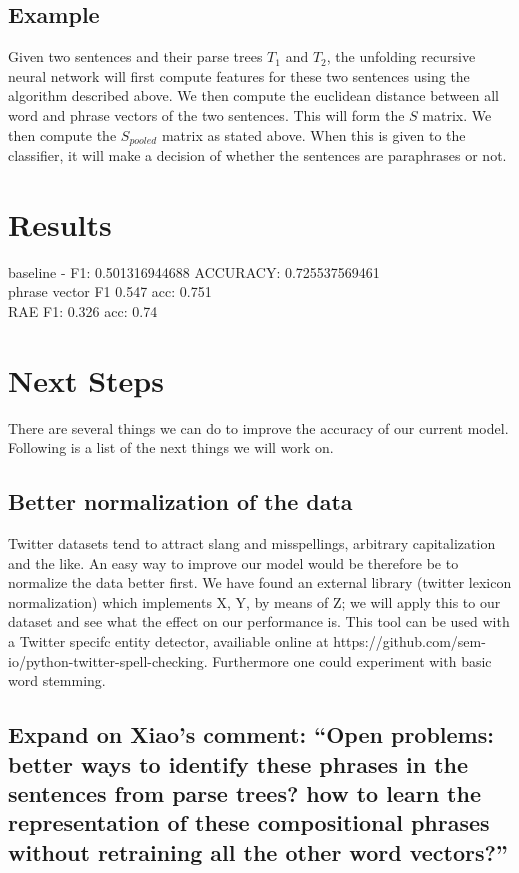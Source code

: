 \documentclass[conference]{IEEEtran}
\begin{document}
\subsection{Example}
Given two sentences and their parse trees $T_1$ and $T_2$, the unfolding recursive neural network will first compute features for these two sentences using the algorithm described above. We then compute the euclidean distance between all word and phrase vectors of the two sentences. This will form the $S$ matrix. We then compute the $S_{pooled}$ matrix as stated above. When this is given to the classifier, it will make a decision of whether the sentences are paraphrases or not.\\

\section{Results}
baseline -  F1:        0.501316944688
    ACCURACY:  0.725537569461\\
phrase vector F1 0.547  acc: 0.751\\
RAE F1: 0.326 acc: 0.74
\section{Next Steps}
There are several things we can do to improve the accuracy of our current model.  Following is a list of the next things we will work on.
\subsection{Better normalization of the data}
Twitter datasets tend to attract slang and misspellings, arbitrary capitalization and the like.  An easy way to improve our model would be therefore be to normalize the data better first.  We have found an external library (twitter lexicon normalization) which implements X, Y, by means of Z; we will apply this to our dataset and see what the effect on our performance is.  This tool can be used with a Twitter specifc entity detector, availiable online at https://github.com/sem-io/python-twitter-spell-checking. Furthermore one could experiment with basic word stemming.  
\subsection{Expand on Xiao's comment: “Open problems: better ways to identify these phrases in the sentences from parse trees? how to learn the representation of these compositional phrases without retraining all the other word vectors?”}
\end{document}
